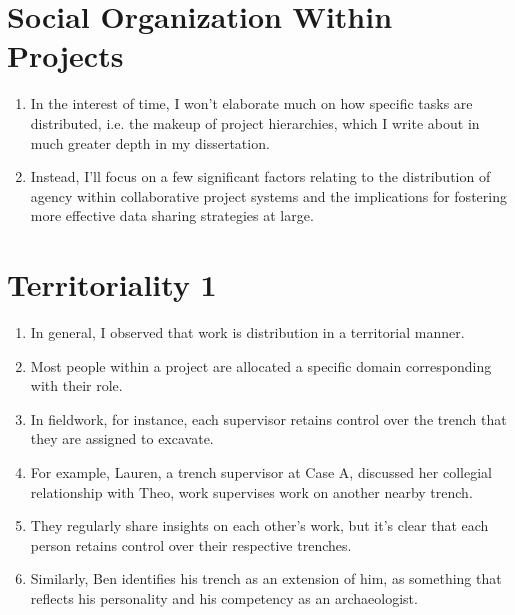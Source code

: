 \documentclass[12pt]{article}
\begin{document}
\section{Social Organization Within Projects}
\begin{enumerate}
  \item In the interest of time, I won't elaborate much on how specific tasks are distributed, i.e. the makeup of project hierarchies, which I write about in much greater depth in my dissertation.
  \item Instead, I'll focus on a few significant factors relating to the distribution of agency within collaborative project systems and the implications for fostering more effective data sharing strategies at large.
\end{enumerate}

\section{Territoriality 1}
\begin{enumerate}
  \item In general, I observed that work is distribution in a territorial manner.
  \item Most people within a project are allocated a specific domain corresponding with their role.
  \item In fieldwork, for instance, each supervisor retains control over the trench that they are assigned to excavate.
  \item For example, Lauren, a trench supervisor at Case A, discussed her collegial relationship with Theo, work supervises work on another nearby trench.
  \item They regularly share insights on each other's work, but it's clear that each person retains control over their respective trenches.
  \item Similarly, Ben identifies his trench as an extension of him, as something that reflects his personality and his competency as an archaeologist.
\end{enumerate}
\end{document}
